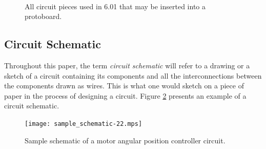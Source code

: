 \begin{figure}
\begin{center}
{\label{fig:op_amp_pin_out}}\\
\hspace{3cm}
\caption[Circuit pieces]{All circuit pieces used in 6.01 that may be
inserted into a protoboard.}
\label{fig:components}
\end{center}
\end{figure}

\subsection{Circuit Schematic}

Throughout this paper, the term \textit{circuit schematic} will refer to a
drawing or a sketch of a circuit containing its components and all the
interconnections between the components drawn as wires. This is what one would
sketch on a piece of paper in the process of designing a circuit. Figure
\ref{fig:schematic} presents an example of a circuit schematic.

\begin{figure}
\begin{center}
\texttt{[image: sample\_schematic-22.mps]}
\caption[Sample circuit schematic]{Sample schematic of a motor angular position
controller circuit.}
\label{fig:schematic}
\end{center}
\end{figure}

